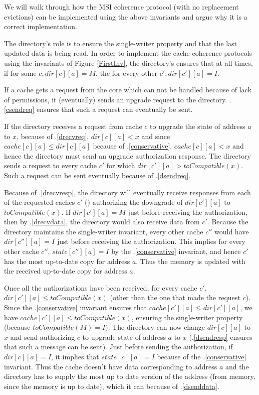 
We will walk through how the MSI coherence protocol (with no replacement
evictions) can be implemented using the above invariants and argue why it is a
correct implementation.

The directory's role is to ensure the single-writer property and that the last
updated data is being read. In order to implement the cache coherence protocols
using the invariants of Figure \ref{FirstInv}, the directory's ensures that at
all times, if for some $c, dir[c][a] = M$, the for every other $c', dir[c'][a] =
I$.

If a cache gets a request from the core which can not be handled because of lack
of permissions, it (eventually) sends an upgrade request to the directory.
\FirstInv.\ref{csendreq} ensures that such a request can eventually be sent.

If the directory receives a request from cache $c$ to upgrade the state of
address $a$ to $x$, because of \FirstInv.\ref{drecvreq}, $dir[c][a] < x$ and
since $cache[c][a] \le dir[c][a]$ because of \FirstInv.\ref{conservative},
$cache[c][a] < x$ and hence the directory must send an upgrade authorization
response. The directory sends a request  to
every cache $c'$ for which $dir[c'][a] > toCompatible(x)$. Such a request can be
sent eventually because of \FirstInv.\ref{dsendreq}.

Because of \FirstInv.\ref{drecvresp}, the directory will eventually receive
responses from each of the requested caches $c'$
() authorizing the downgrade of $dir[c'][a]$
to $toCompatible(x)$. If $dir[c'][a] = M$ just before receiving the
authorization, then by \FirstInv.\ref{drecvdata}, the directory would also
receive data from $c'$. Because the directory maintains the single-writer
invariant, every other cache $c''$ would have $dir[c''][a] = I$ just before
receiving the authorization. This implies for every other cache $c''$,
$state[c''][a] = I$ by the \FirstInv.\ref{conservative} invariant, and hence
$c'$ has the most up-to-date copy for address $a$. Thus the memory is updated
with the received up-to-date copy for address $a$.

Once all the authorizations have been received, for every cache $c'$,
$dir[c'][a] \le toCompatible(x)$ (other than the one that made the request $c$).
Since the \FirstInv.\ref{conservative} invariant ensures that $cache[c'][a] \le
dir[c'][a]$, we have $cache[c'][a] \le toCompatible(x)$, ensuring the
single-writer property (because $toCompatible(M) = I$). The directory can now
change $dir[c][a]$ to $x$ and send  authorizing $c$ to
upgrade state of address $a$ to $x$ (\FirstInv.\ref{dsendresp} ensures that such
a message can be sent). Just before sending the authorization, if $dir[c][a] =
I$, it implies that $state[c][a] = I$ because of the
\FirstInv.\ref{conservative} invariant.  Thus the cache doesn't have data
corresponding to address $a$ and the directory has to supply the most up to date
version of the address (from memory, since the memory is up to date), which it
can because of \FirstInv.\ref{dsenddata}.

